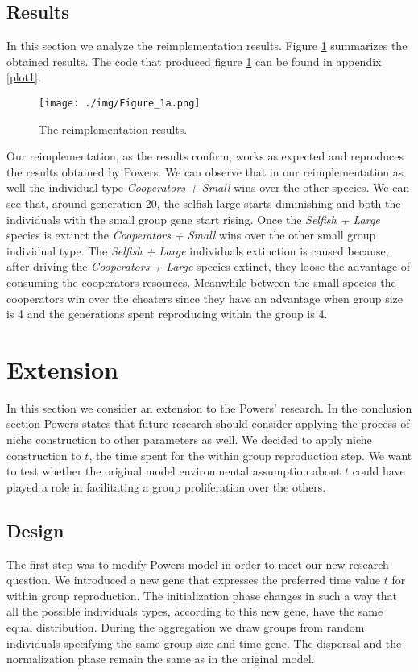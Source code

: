 \documentclass[runningheads]{llncs}
\begin{document}
\subsection{Results}
In this section we analyze the reimplementation results. Figure \ref{fig1}
summarizes the obtained results. The code that produced figure
\ref{fig1} can be found in appendix \ref{plot1}.
\begin{figure}
\texttt{[image: ./img/Figure\_1a.png]}
\caption{The reimplementation results.} \label{fig1}
\end{figure}
Our reimplementation, as the results confirm, works as expected and
reproduces the results obtained by Powers. We can observe that in our
reimplementation as well the individual type \textit{Cooperators +
  Small} wins over the other species. We can see that, around
generation 20, the selfish large starts diminishing and both the
individuals with the small group gene start rising. Once the
\textit{Selfish + Large} species is extinct the \textit{Cooperators +
  Small} wins over the other small group individual type. The
\textit{Selfish + Large} individuals extinction is caused because,
after driving the \textit{Cooperators + Large} species extinct, they
loose the advantage of consuming the cooperators resources. Meanwhile
between the small species the cooperators win over the cheaters since
they have an advantage when group size is 4 and the generations spent
reproducing within the group is 4.


\section{Extension}
In this section we consider an extension to the Powers' research. In
the conclusion section Powers states that future research should
consider applying the process of niche construction to other
parameters as well. We decided to apply niche construction to $t$, the
time spent for the within group reproduction step. We want to test
whether the original model environmental assumption about $t$ could
have played a role in facilitating a group proliferation over the
others.

\subsection{Design}
The first step was to modify Powers model in order to meet our new
research question. We introduced a new gene that expresses the
preferred time value $t$ for within group reproduction. The
initialization phase changes in such a way that all the possible
individuals types, according to this new gene, have the same equal
distribution. During the aggregation we draw groups from random
individuals specifying the same group size and time gene. The
dispersal and the normalization phase remain the same as in the
original model.
\end{document}
